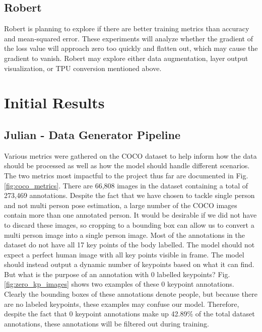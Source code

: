 \documentclass[11pt, letterpaper]{article}
\begin{document}
\subsection{Robert}
Robert is planning to explore if there are better training metrics than accuracy and mean-squared error. These experiments will analyze whether the gradient of the loss value will approach zero too quickly and flatten out, which may cause the gradient to vanish. Robert may explore either data augmentation, layer output visualization, or TPU conversion mentioned above. 

\section{Initial Results}
\label{SectionInitialResults}

\subsection{Julian - Data Generator Pipeline}

Various metrics were gathered on the COCO dataset to help inform how the data should be processed as well as how the model should handle different scenarios. The two metrics most impactful to the project thus far are documented in Fig. \ref{fig:coco_metrics}. There are 66,808 images in the dataset containing a total of 273,469 annotations. Despite the fact that we have chosen to tackle single person and not multi person pose estimation, a large number of the COCO images contain more than one annotated person. It would be desirable if we did not have to discard these images, so cropping to a bounding box can allow us to convert a multi person image into a single person image. Most of the annotations in the dataset do not have all 17 key points of the body labelled. The model should not expect a perfect human image with all key points visible in frame. The model should instead output a dynamic number of keypoints based on what it can find. But what is the purpose of an annotation with 0 labelled keypoints? Fig. \ref{fig:zero_kp_images} shows two examples of these 0 keypoint annotations. Clearly the bounding boxes of these annotations denote people, but because there are no labeled keypoints, these examples may confuse our model. Therefore, despite the fact that 0 keypoint annotations make up 42.89\% of the total dataset annotations, these annotations will be filtered out during training.
\end{document}
